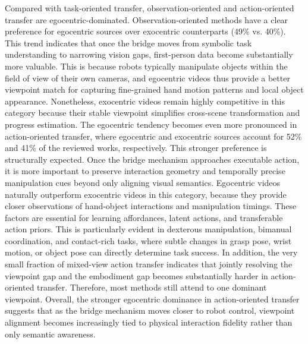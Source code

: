 \documentclass[Afour,sageh,times]{sagej}
\begin{document}
Compared with task-oriented transfer, observation-oriented and action-oriented transfer are egocentric-dominated. Observation-oriented methods have a clear preference for egocentric sources over exocentric counterparts (49\% vs. 40\%). This trend indicates that once the bridge moves from symbolic task understanding to narrowing vision gaps, first-person data become substantially more valuable. This is because robots typically manipulate objects within the field of view of their own cameras, and egocentric videos thus provide a better viewpoint match for capturing fine-grained hand motion patterns and local object appearance. Nonetheless, exocentric videos remain highly competitive in this category because their stable viewpoint simplifies cross-scene transformation and progress estimation. The egocentric tendency becomes even more pronounced in action-oriented transfer, where egocentric and exocentric sources account for 52\% and 41\% of the reviewed works, respectively. This stronger preference is structurally expected. Once the bridge mechanism approaches executable action, it is more important to preserve interaction geometry and temporally precise manipulation cues beyond only aligning visual semantics. Egocentric videos naturally outperform exocentric videos in this category, because they provide closer observations of hand-object interactions and manipulation timings. These factors are essential for learning affordances, latent actions, and transferable action priors. This is particularly evident in dexterous manipulation, bimanual coordination, and contact-rich tasks, where subtle changes in grasp pose, wrist motion, or object pose can directly determine task success. In addition, the very small fraction of mixed-view action transfer indicates that jointly resolving the viewpoint gap and the embodiment gap becomes substantially harder in action-oriented transfer. Therefore, most methods still attend to one dominant viewpoint. Overall, the stronger egocentric dominance in action-oriented transfer suggests that as the bridge mechanism moves closer to robot control, viewpoint alignment becomes increasingly tied to physical interaction fidelity rather than only semantic awareness.
\end{document}
